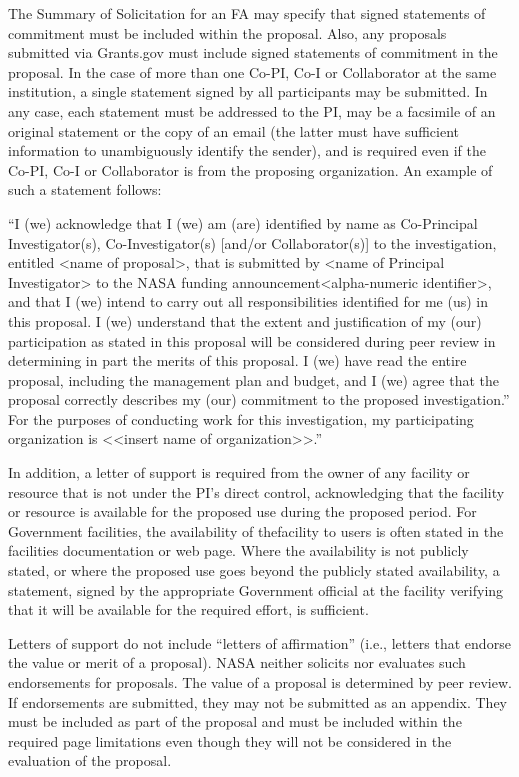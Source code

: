 \documentclass[12pt]{article}
\begin{document}
The Summary of Solicitation for an FA may specify that signed
statements of commitment must be included within the proposal. Also,
any proposals submitted via Grants.gov must include signed statements
of commitment in the proposal. In the case of more than one Co-PI,
Co-I or Collaborator at the same institution, a single statement
signed by all participants may be submitted. In any case, each
statement must be addressed to the PI, may be a facsimile of an
original statement or the copy of an email (the latter must have
sufficient information to unambiguously identify the sender), and is
required even if the Co-PI, Co-I or Collaborator is from the proposing
organization. An example of such a statement follows:

``I (we) acknowledge that I (we) am (are) identified by name as
Co-Principal Investigator(s), Co-Investigator(s) [and/or
Collaborator(s)] to the investigation, entitled <name of proposal>,
that is submitted by <name of Principal Investigator> to the NASA
funding announcement<alpha-numeric identifier>, and that I (we) intend
to carry out all responsibilities identified for me (us) in this
proposal. I (we) understand that the extent and justification of my
(our) participation as stated in this proposal will be considered
during peer review in determining in part the merits of this
proposal. I (we) have read the entire proposal, including the
management plan and budget, and I (we) agree that the proposal
correctly describes my (our) commitment to the proposed
investigation.'' For the purposes of conducting work for this
investigation, my participating organization is <<insert name of
organization>>.''

In addition, a letter of support is required from the owner of any
facility or resource that is not under the PI's direct control,
acknowledging that the facility or resource is available for the
proposed use during the proposed period. For Government facilities,
the availability of thefacility to users is often stated in the
facilities documentation or web page. Where the availability is not
publicly stated, or where the proposed use goes beyond the publicly
stated availability, a statement, signed by the appropriate Government
official at the facility verifying that it will be available for the
required effort, is sufficient.

Letters of support do not include ``letters of affirmation'' (i.e.,
letters that endorse the value or merit of a proposal). NASA neither
solicits nor evaluates such endorsements for proposals. The value of a
proposal is determined by peer review. If endorsements are submitted,
they may not be submitted as an appendix. They must be included as
part of the proposal and must be included within the required page
limitations even though they will not be considered in the evaluation
of the proposal.
\end{document}
